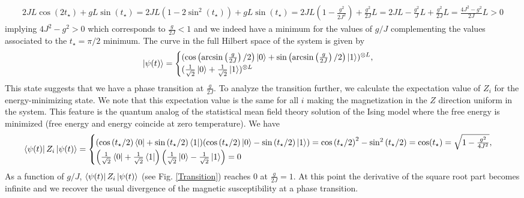 \documentclass[10pt, a4paper]{article}
\begin{document}
{\begin{enumerate}
  \begin{align*}
    2JL\cos(2t_\star) + gL \sin(t_\star) = 2JL (1-2\sin^2(t_\star)) + gL \sin(t_\star) = 2JL \left(1-\frac{g^2}{2J^2}\right) + \frac{g^2}{2J}L = 2JL -\frac{g^2}{J}L + \frac{g^2}{2J}L = \frac{4J^2 - g^2}{2J}L > 0
  \end{align*} 
  implying $4J^2 - g^2 > 0$ which corresponds to $\frac{g}{2J} < 1$ and we indeed have a minimum for the values of $g/J$ complementing the values associated to the $t_\star=\pi/2$ minimum. The curve in the full Hilbert space of the system is given by 
  \begin{align*}
    \ket{\psi(t)} = 
    \begin{cases}
      (\cos\left(\arcsin\left(\frac{g}{2J}\right)/2\right)\ket{0} + \sin\left(\arcsin\left(\frac{g}{2J}\right)/2\right)\ket{1})^{\otimes L},\\
      (\frac{1}{\sqrt{2}}\ket{0} + \frac{1}{\sqrt{2}}\ket{1})^{\otimes L}
    \end{cases}
  \end{align*}
  This state suggests that we have a phase transition at $\frac{g}{2J}$. To analyze the transition further, we calculate the expectation value of $Z_i$ for the energy-minimizing state. We note that this expectation value is the same for all $i$ making the magnetization in the $Z$ direction uniform in the system. This feature is the quantum analog of the statistical mean field theory solution of the Ising model where the free energy is minimized (free energy and energy coincide at zero temperature). We have 
  \begin{align*}
    \bra{\psi(t)}Z_i\ket{\psi(t)} =  \begin{cases}
      (\cos\left(t_\star/2\right)\bra{0} + \sin\left(t_\star/2\right)\bra{1})(\cos\left(t_\star/2\right)\ket{0} - \sin\left(t_\star/2\right)\ket{1}) = \cos\left(t_\star/2\right)^2 - \sin^2\left(t_\star/2\right) = \cos(t_\star) = \sqrt{1- \frac{g^2}{4J^2}},\\
      \left(\frac{1}{\sqrt{2}}\bra{0} + \frac{1}{\sqrt{2}}\bra{1}\right)\left(\frac{1}{\sqrt{2}}\ket{0} - \frac{1}{\sqrt{2}}\ket{1}\right) = 0 
    \end{cases}
  \end{align*}
  As a function of $g/J$, $\bra{\psi(t)}Z_i\ket{\psi(t)}$ (see Fig. \ref{Transition}) reaches $0$ at $\frac{g}{2J} =1$. At this point the derivative of the square root part becomes infinite and we recover the usual divergence of the magnetic susceptibility at a phase transition. 
  \begin{figure}

\end{figure}
\end{enumerate}}
\end{document}
